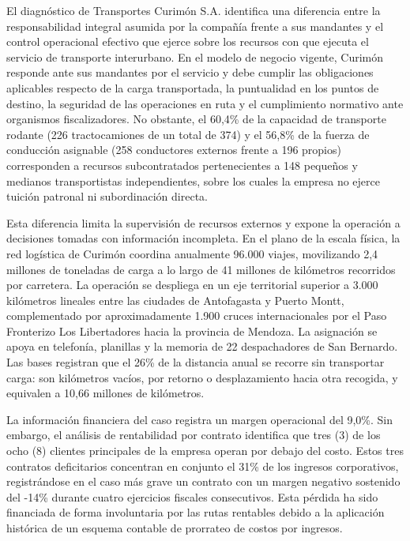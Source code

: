 El diagnóstico de Transportes Curimón S.A. identifica una diferencia entre la responsabilidad integral asumida por la compañía frente a sus mandantes y el control operacional efectivo que ejerce sobre los recursos con que ejecuta el servicio de transporte interurbano. En el modelo de negocio vigente, Curimón responde ante sus mandantes por el servicio y debe cumplir las obligaciones aplicables respecto de la carga transportada, la puntualidad en los puntos de destino, la seguridad de las operaciones en ruta y el cumplimiento normativo ante organismos fiscalizadores. No obstante, el 60,4\% de la capacidad de transporte rodante (226 tractocamiones de un total de 374) y el 56,8\% de la fuerza de conducción asignable (258 conductores externos frente a 196 propios) corresponden a recursos subcontratados pertenecientes a 148 pequeños y medianos transportistas independientes, sobre los cuales la empresa no ejerce tuición patronal ni subordinación directa.

Esta diferencia limita la supervisión de recursos externos y expone la operación a decisiones tomadas con información incompleta. En el plano de la escala física, la red logística de Curimón coordina anualmente 96.000 viajes, movilizando 2,4 millones de toneladas de carga a lo largo de 41 millones de kilómetros recorridos por carretera. La operación se despliega en un eje territorial superior a 3.000 kilómetros lineales entre las ciudades de Antofagasta y Puerto Montt, complementado por aproximadamente 1.900 cruces internacionales por el Paso Fronterizo Los Libertadores hacia la provincia de Mendoza. La asignación se apoya en telefonía, planillas y la memoria de 22 despachadores de San Bernardo. Las bases registran que el 26\% de la distancia anual se recorre sin transportar carga: son kilómetros vacíos, por retorno o desplazamiento hacia otra recogida, y equivalen a 10,66 millones de kilómetros.

La información financiera del caso registra un margen operacional del 9,0\%. Sin embargo, el análisis de rentabilidad por contrato identifica que tres (3) de los ocho (8) clientes principales de la empresa operan por debajo del costo. Estos tres contratos deficitarios concentran en conjunto el 31\% de los ingresos corporativos, registrándose en el caso más grave un contrato con un margen negativo sostenido del -14\% durante cuatro ejercicios fiscales consecutivos. Esta pérdida ha sido financiada de forma involuntaria por las rutas rentables debido a la aplicación histórica de un esquema contable de prorrateo de costos por ingresos.

